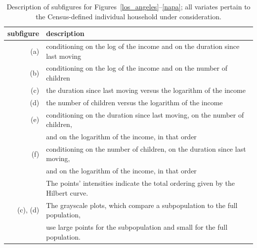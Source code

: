 \documentclass{article}
\begin{document}
\begin{table}
\caption{Description of subfigures for Figures~\ref{los_angeles}--\ref{napa};
all variates pertain to the Census-defined individual household
under consideration.}
\label{labelsw}
\begin{center}
\begin{tabular}{rl}
subfigure & description \\\hline
(a) & conditioning on the log of the income
and on the duration since last moving \\
(b) & conditioning on the log of the income
and on the number of children \\
(c) & the duration since last moving versus the logarithm of the income \\
(d) & the number of children versus the logarithm of the income \\
(e) & conditioning on the duration since last moving,
on the number of children, \\
& and on the logarithm of the income, in that order \\
(f) & conditioning on the number of children,
on the duration since last moving, \\
& and on the logarithm of the income, in that order \\\hline
& The points' intensities indicate the total ordering given
by the Hilbert curve. \\
(c), (d) & The grayscale plots, which compare a subpopulation
to the full population, \\
& use large points for the subpopulation and small for the full population.
\end{tabular}
\end{center}
\end{table}


\clearpage
\end{document}
